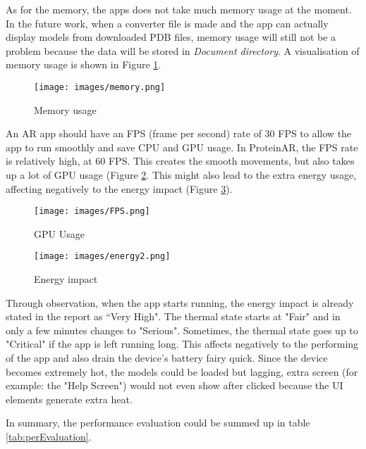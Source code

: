 As for the memory, the apps does not take much memory usage at the moment. In the future work, when a converter file is made and the app can actually display models from downloaded PDB files, memory usage will still not be a problem because the data will be stored in \emph{Document directory}. A visualisation of memory usage is shown in Figure \ref{fig:memory}.

 \begin{figure}[!htp]
	\centering
	\texttt{[image: images/memory.png]}
	\caption{Memory usage}
	\label{fig:memory}
\end{figure}

An AR app should have an FPS (frame per second) rate of 30 FPS to allow the app to run smoothly and save CPU and GPU usage. In ProteinAR, the FPS rate is relatively high, at 60 FPS. This creates the smooth movements, but also takes up a lot of GPU usage (Figure \ref{fig:FPS}. This might also lead to the extra energy usage, affecting negatively to the energy impact (Figure \ref{fig:energy2}). 

 \begin{figure}[!htp]
	\centering
	\texttt{[image: images/FPS.png]}
	\caption{GPU Usage}
	\label{fig:FPS}
\end{figure}

 \begin{figure}[!htp]
	\centering
	\texttt{[image: images/energy2.png]}
	\caption{Energy impact}
	\label{fig:energy2}
\end{figure}

Through observation, when the app starts running, the energy impact is already stated in the report as ``Very High". The thermal state starts at "Fair" and in only a few minutes changes to "Serious". Sometimes, the thermal state goes up to "Critical" if the app is left running long. 
This affects negatively to the performing of the app and also drain the device's battery fairy quick. Since the device becomes extremely hot, the models could be loaded but lagging, extra screen (for example: the "Help Screen") would not even show after clicked because the UI elements generate extra heat.

In summary, the performance evaluation could be summed up in table \ref{tab:perEvaluation}.

